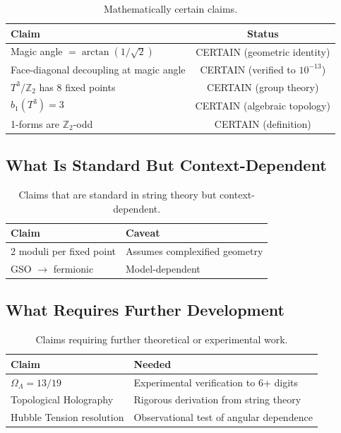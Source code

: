 \documentclass[12pt,a4paper]{article}
\newcommand{\Ztwo}{\mathbb{Z}_2}
\newcommand{\Tthree}{T^3}
\newcommand{\OmegaL}{\Omega_\Lambda}
\begin{document}
\begin{table}[H]
\centering
\begin{tabular}{lc}
\toprule
\textbf{Claim} & \textbf{Status} \\
\midrule
Magic angle $= \arctan(1/\sqrt{2})$ & CERTAIN (geometric identity) \\
Face-diagonal decoupling at magic angle & CERTAIN (verified to $10^{-13}$) \\
$\Tthree/\Ztwo$ has 8 fixed points & CERTAIN (group theory) \\
$b_1(\Tthree) = 3$ & CERTAIN (algebraic topology) \\
1-forms are $\Ztwo$-odd & CERTAIN (definition) \\
\bottomrule
\end{tabular}
\caption{Mathematically certain claims.}
\end{table}

\subsection{What Is Standard But Context-Dependent}

\begin{table}[H]
\centering
\begin{tabular}{ll}
\toprule
\textbf{Claim} & \textbf{Caveat} \\
\midrule
2 moduli per fixed point & Assumes complexified geometry \\
GSO $\to$ fermionic & Model-dependent \\
\bottomrule
\end{tabular}
\caption{Claims that are standard in string theory but context-dependent.}
\end{table}

\subsection{What Requires Further Development}

\begin{table}[H]
\centering
\begin{tabular}{ll}
\toprule
\textbf{Claim} & \textbf{Needed} \\
\midrule
$\OmegaL = 13/19$ & Experimental verification to 6+ digits \\
Topological Holography & Rigorous derivation from string theory \\
Hubble Tension resolution & Observational test of angular dependence \\
\bottomrule
\end{tabular}
\caption{Claims requiring further theoretical or experimental work.}
\end{table}
\end{document}
